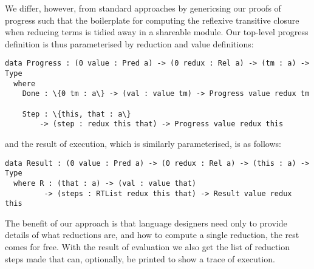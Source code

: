 We differ, however, from standard approaches by genericsing our proofs of progress such that the boilerplate for computing the reflexive transitive closure when reducing terms is tidied away in a shareable module.
%
Our top-level progress definition is thus parameterised by reduction and value definitions:

\begin{Verbatim}
data Progress : (0 value : Pred a) -> (0 redux : Rel a) -> (tm : a) -> Type
  where
    Done : \{0 tm : a\} -> (val : value tm) -> Progress value redux tm

    Step : \{this, that : a\}
        -> (step : redux this that) -> Progress value redux this
\end{Verbatim}

\noindent
and the result of execution, which is similarly parameterised, is as follows:

\begin{Verbatim}
data Result : (0 value : Pred a) -> (0 redux : Rel a) -> (this : a) -> Type
  where R : (that : a) -> (val : value that)
         -> (steps : RTList redux this that) -> Result value redux this
\end{Verbatim}

The benefit of our approach is that language designers need only to provide details of what reductions are, and how to compute a single reduction, the rest comes for free.
%
With the result of evaluation we also get the list of reduction steps made that can, optionally, be printed to show a trace of execution.

